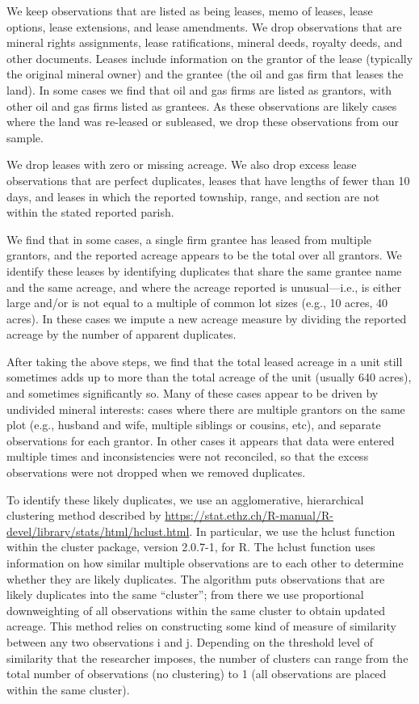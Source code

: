 \documentclass[12pt]{article}
\begin{document}
We keep observations that are listed as being leases, memo of leases, lease options, lease extensions, and lease amendments. We drop observations that are mineral rights assignments, lease ratifications, mineral deeds, royalty deeds, and other documents. Leases include information on the grantor of the lease (typically the original mineral owner) and the grantee (the oil and gas firm that leases the land). In some cases we find that oil and gas firms are listed as grantors, with other oil and gas firms listed as grantees. As these observations are likely cases where the land was re-leased or subleased, we drop these observations from our sample.

We drop leases with zero or missing acreage. We also drop excess lease observations that are perfect duplicates, leases that have lengths of fewer than 10 days, and leases in which the reported township, range, and section are not within the stated reported parish.

We find that in some cases, a single firm grantee has leased from multiple grantors, and the reported acreage appears to be the total over all grantors. We identify these leases by identifying duplicates that share the same grantee name and the same acreage, and where the acreage reported is unusual---i.e., is either large and/or is not equal to a multiple of common lot sizes (e.g., 10 acres, 40 acres). In these cases we impute a new acreage measure by dividing the reported acreage by the number of apparent duplicates.

After taking the above steps, we find that the total leased acreage in a unit still sometimes adds up to more than the total acreage of the unit (usually 640 acres), and sometimes significantly so. Many of these cases appear to be driven by undivided mineral interests: cases where there are multiple grantors on the same plot (e.g., husband and wife, multiple siblings or cousins, etc), and separate observations for each grantor. In other cases it appears that data were entered multiple times and inconsistencies were not reconciled, so that the excess observations were not dropped when we removed duplicates.

To identify these likely duplicates, we use an agglomerative, hierarchical clustering method described by \url{https://stat.ethz.ch/R-manual/R-devel/library/stats/html/hclust.html}. In particular, we use the hclust function within the cluster package, version 2.0.7-1, for R. The hclust function uses information on how similar multiple observations are to each other to determine whether they are likely duplicates. The algorithm puts observations that are likely duplicates into the same ``cluster''; from there we use proportional downweighting of all observations within the same cluster to obtain updated acreage. This method relies on constructing some kind of measure of similarity between any two observations i and j. Depending on the threshold level of similarity that the researcher imposes, the number of clusters can range from the total number of observations (no clustering) to 1 (all observations are placed within the same cluster).
\end{document}
